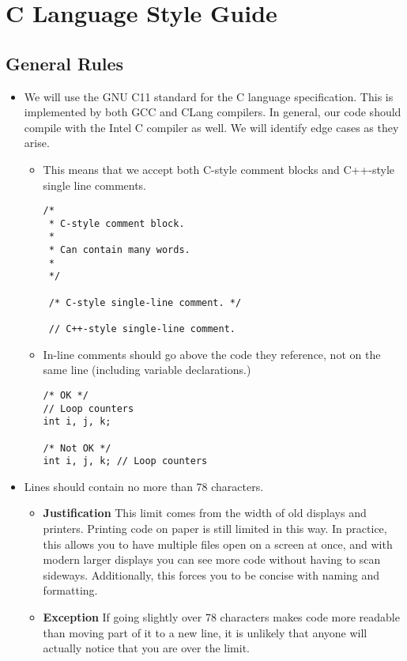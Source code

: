 \pagebreak
\section{C Language Style Guide}





\subsection{General Rules}

\begin{itemize}
    \item We will use the GNU C11 standard for the C language specification.  This is implemented by both GCC and CLang compilers.  In general, our code should compile with the Intel C compiler as well.  We will identify edge cases as they arise.
    \begin{itemize}
        \item This means that we accept both C-style comment blocks and C++-style single line comments.
        \begin{verbatim}
/*
 * C-style comment block.
 *
 * Can contain many words.
 *
 */

 /* C-style single-line comment. */
 
 // C++-style single-line comment.
        \end{verbatim}
        \item In-line comments should go above the code they reference, not on the same line (including variable declarations.)
        \begin{verbatim}
/* OK */
// Loop counters
int i, j, k;

/* Not OK */
int i, j, k; // Loop counters
        \end{verbatim}
    \end{itemize}

    \item Lines should contain no more than 78 characters.
        \begin{itemize}
            \item \textbf{Justification} This limit comes from the width of old displays and printers.  Printing code on paper is still limited in this way.  In practice, this allows you to have multiple files open on a screen at once, and with modern larger displays you can see more code without having to scan sideways.  Additionally, this forces you to be concise with naming and formatting.
            \item \textbf{Exception} If going slightly over 78 characters makes code more readable than moving part of it to a new line, it is unlikely that anyone will actually notice that you are over the limit.
        \end{itemize}


\end{itemize}
